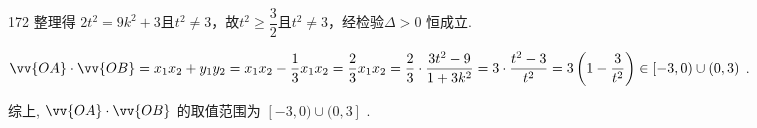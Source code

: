 \begin{enumerate}
\begin{jieda}
\begin{enumerate}
\begin{enumerate}
\begin{dingautolist}{172}
                    整理得 $2{t}^{2} = 9{k}^{2} + 3$且$t^2 \neq 3$，故${t}^{2} \geq \dfrac{3}{2}$且$t^2 \neq 3$，经检验$\Delta  > 0$ 恒成立.
                    
                    $\vv{OA} \cdot  \vv{OB} = {x}_{1}{x}_{2} + {y}_{1}{y}_{2} = {x}_{1}{x}_{2} - \dfrac{1}{3}{x}_{1}{x}_{2} = \dfrac{2}{3}{x}_{1}{x}_{2} = \dfrac{2}{3} \cdot  \dfrac{3{t}^{2} - 9}{1 + 3{k}^{2}} = 3 \cdot  \dfrac{{t}^{2} - 3}{{t}^{2}} = 3\left( {1 - \dfrac{3}{{t}^{2}}}\right) \in  \lbrack  - 3,0) \cup  \left( {0,3}\right)$ .
                \end{dingautolist}
                综上, $\vv{OA} \cdot  \vv{OB}$ 的取值范围为 $\left\lbrack  {-3,0)\cup (0,3}\right\rbrack$ .
            \end{enumerate}
        \end{enumerate}
    \end{jieda}
\end{enumerate}
